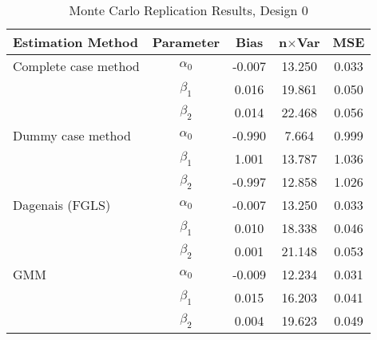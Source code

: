 \begin{table}
\centering
\caption{Monte Carlo Replication Results, Design 0}
\label{table:MCReplicationResultsDesign0}
\begin{tabular}{lcccc}
\toprule
Estimation Method & Parameter & Bias & n$\times$Var & MSE \\
\midrule
Complete case method & $\alpha_0$ & -0.007 & 13.250 & 0.033 \\
 & $\beta_1$ & 0.016 & 19.861 & 0.050 \\
 & $\beta_2$ & 0.014 & 22.468 & 0.056 \\
Dummy case method & $\alpha_0$ & -0.990 & 7.664 & 0.999 \\
 & $\beta_1$ & 1.001 & 13.787 & 1.036 \\
 & $\beta_2$ & -0.997 & 12.858 & 1.026 \\
Dagenais (FGLS) & $\alpha_0$ & -0.007 & 13.250 & 0.033 \\
 & $\beta_1$ & 0.010 & 18.338 & 0.046 \\
 & $\beta_2$ & 0.001 & 21.148 & 0.053 \\
GMM & $\alpha_0$ & -0.009 & 12.234 & 0.031 \\
 & $\beta_1$ & 0.015 & 16.203 & 0.041 \\
 & $\beta_2$ & 0.004 & 19.623 & 0.049 \\
\bottomrule
\end{tabular}
\end{table}
